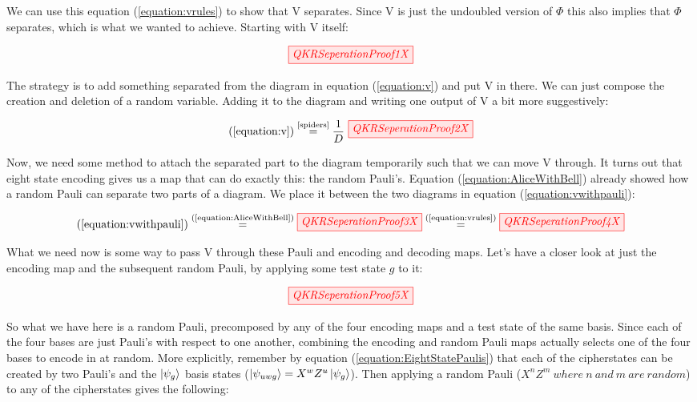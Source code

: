 \documentclass[]{article}
\newcommand{\equaltext}[1]{\ensuremath{\stackrel{\text{#1}}{=}}}
\begin{document}
We can use this equation (\ref{equation:vrules}) to show that V separates. Since V is just the undoubled version of $\Phi$ this also implies that $\Phi$ separates, which is what we wanted to achieve. Starting with V itself:

\begin{equation}
	\label{equation:v}
	\tikzfig{QKRSeperationProof1X}
\end{equation}

The strategy is to add something separated from the diagram in equation (\ref{equation:v}) and put V in there. We can just compose the creation and deletion of a random variable. Adding it to the diagram and writing one output of V a bit more suggestively:

\begin{equation}
	\label{equation:vwithpauli}
	(\ref{equation:v}) \equaltext{\ref{spiders}} \frac{1}{D}~
	\tikzfig{QKRSeperationProof2X}
\end{equation}

Now, we need some method to attach the separated part to the diagram temporarily such that we can move V through. It turns out that eight state encoding gives us a map that can do exactly this: the random Pauli's. Equation (\ref{equation:AliceWithBell}) already showed how a random Pauli can separate two parts of a diagram. We place it between the two diagrams in equation (\ref{equation:vwithpauli}):

\begin{equation}
\label{equation:movevthrough}
(\ref{equation:vwithpauli}) \equaltext{(\ref{equation:AliceWithBell})} \tikzfig{QKRSeperationProof3X} \equaltext{(\ref{equation:vrules})} \tikzfig{QKRSeperationProof4X}
\end{equation}

What we need now is some way to pass V through these Pauli and encoding and decoding maps. Let's have a closer look at just the encoding map and the subsequent random Pauli, by applying some test state $g$ to it:

\begin{equation}
	\label{equation:RedSpiderRandomPauli}
	\tikzfig{QKRSeperationProof5X}
\end{equation}

So what we have here is a random Pauli, precomposed by any of the four encoding maps and a test state of the same basis. Since each of the four bases are just Pauli's with respect to one another, combining the encoding and random Pauli maps actually selects one of the four bases to encode in at random. More explicitly, remember by equation (\ref{equation:EightStatePaulis}) that each of the cipherstates can be created by two Pauli's and the $\ket{\psi_g}$ basis states ($\ket{\psi_{uwg}} = X^w Z^u\ket{\psi_{g}}$). Then applying a random Pauli ($X^n Z^m~where~n~and~m~are~random$) to any of the cipherstates gives the following:
\end{document}
